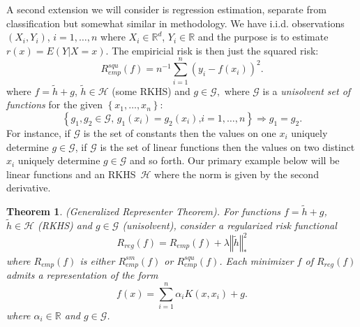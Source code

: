 \documentclass[11pt,twoside]{article}%
\theoremstyle{change}
\newtheorem{theorem}{Theorem}[section]
\begin{document}
A second extension we will consider is regression estimation, separate from
classification but somewhat similar in methodology. We have i.i.d.
observations $\left(  X_{i},Y_{i}\right)  $, $i=1,\ldots,n$ where $X_{i}%
\in\mathbb{R}^{d}$, $Y_{i}\in\mathbb{R}$ and the purpose is to estimate
$r(x)=E\left(  Y|X=x\right)  $. The empiricial risk is then just the squared
risk:
\[
R_{emp}^{squ}(f)=n^{-1}\sum_{i=1}^{n}(y_{i}-f(x_{i}))^{2}.
\]
where $f=\tilde{h}+g$, $\tilde{h}\in\mathcal{H}$ (some RKHS) and
$g\in\mathcal{G},$ where $\mathcal{G}$ is a \textit{unisolvent set of
functions} for the given $\left\{  x_{1},\ldots,x_{n}\right\}  $:
\[
\left\{  g_{1},g_{2}\in\mathcal{G}\text{, }g_{1}(x_{i})=g_{2}(x_{i})\text{,
}i=1,\ldots,n\right\}  \Longrightarrow g_{1}=g_{2}\text{.}%
\]
For instance, if $\mathcal{G}$ is the set of constants then the values on one
$x_{i}$ uniquely determine $g\in\mathcal{G}$, if $\mathcal{G}$ is the set of
linear functions then the values on two distinct $x_{i}$ uniquely determine
$g\in\mathcal{G}$ and so forth. Our primary example below will be linear
functions and an RKHS\ $\mathcal{H}$ where the norm is given by the second derivative.

\begin{theorem}
\label{theor-genlzd-representer}(Generalized Representer Theorem). For
functions $f=\tilde{h}+g$, $\tilde{h}\in\mathcal{H}$ (RKHS) and $g\in
\mathcal{G}$ (unisolvent), consider a regularized risk functional
\[
R_{reg}(f)=R_{emp}(f)+\lambda\left\Vert \tilde{h}\right\Vert _{\ast}^{2}%
\]
where $R_{emp}(f)$ is either $R_{emp}^{sm}(f)$ or $R_{emp}^{squ}(f)$. Each
minimizer $f$ of $R_{reg}(f)$ admits a representation of the form
\[
f(x)=\sum_{i=1}^{n}\alpha_{i}K\left(  x,x_{i}\right)  +g.
\]
where $\alpha_{i}\in\mathbb{R}$ and $g\in\mathcal{G}$.
\end{theorem}
\end{document}
